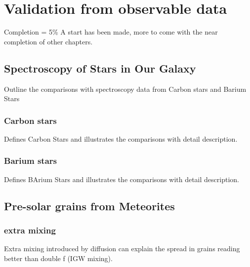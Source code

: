 \chapter{Validation from observable data}

Completion = 5\%
A start has been made, more to come with the near completion of other chapters.

\section{Spectroscopy of Stars in Our Galaxy}

Outline the comparisons with spectroscopy data from Carbon stars and Barium Stars

\subsection{Carbon stars}

Defines Carbon Stars and illustrates the comparisons with detail description.

\subsection{Barium stars}

Defines BArium Stars and illustrates the comparisons with detail description.

\section{Pre-solar grains from Meteorites}



\subsection{extra mixing}

Extra mixing introduced by diffusion can explain the spread in grains reading better than double f (IGW mixing).
